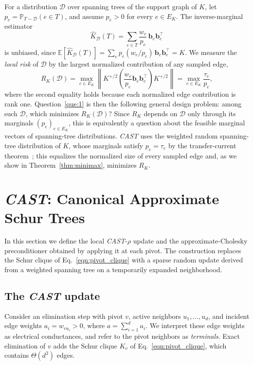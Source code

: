 \documentclass{article}
\newcommand{\CAST}{\textit{CAST}\xspace}
\newcommand{\1}{\mathbbm{1}}
\theoremstyle{plain}
\begin{document}
For a distribution $\mathcal D$ over spanning trees of the support graph of $K$, let $p_e=\mathbb{P}_{T\sim\mathcal D}(e\in T)$, and assume $p_e>0$ for every $e\in E_K$. The inverse-marginal estimator
\begin{equation*}
  \widehat K_{\mathcal{D}}(T)=\sum_{e\in T}\frac{w_e}{p_e}\,
  \mathbf b_e\mathbf b_e^\top
\end{equation*}
is unbiased, since
$\mathbb E[\widehat K_{\mathcal D}(T)]
 =\sum_e p_e(w_e/p_e)\,\mathbf b_e\mathbf b_e^\top=K$. We measure the
\emph{local risk} of $\mathcal D$ by the largest normalized contribution
of any sampled edge,
\begin{equation}\label{eq:risk}
R_K(\mathcal{D}) = \max_{e\in E_K}\left\lVert K^{+/2}\!\left(
\frac{w_e}{p_e}\mathbf b_e\mathbf b_e^\top\right)\!K^{+/2}\right\rVert
= \max_{e\in E_K}\frac{\tau_e}{p_e},
\end{equation}
where the second equality holds because each normalized edge
contribution is rank one. Question~\ref{que:1} is then the following
general design problem: among such $\mathcal D$, which minimizes
$R_K(\mathcal D)$? Since $R_K$ depends on $\mathcal D$ only through its
marginals $(p_e)_{e\in E_K}$, this is equivalently a question about the
feasible marginal vectors of spanning-tree distributions. \CAST{} uses
the weighted random spanning-tree distribution of $K$, whose marginals
satisfy $p_e=\tau_e$ by the transfer-current
theorem~\cite{lyons2003determinantal}; this equalizes the normalized size
of every sampled edge and, as we show in Theorem~\ref{thm:minimax},
minimizes $R_K$.


\section{\CAST: Canonical Approximate Schur Trees}
\label{sec:cast}

In this section we define the local \CAST-$\rho$ update and the approximate-Cholesky pre\-conditioner obtained by applying it at each
pivot. The construction replaces the Schur clique of Eq.~\eqref{eqn:pivot_clique} with a sparse random update derived from a weighted spanning tree on a temporarily expanded neighborhood.


\subsection{The \CAST{} update}
\label{sec:cast-update}

Consider an elimination step with pivot $v$, active neighbors
$u_1,\ldots,u_d$, and incident edge weights $a_i=w_{vu_i}>0$, where
$a=\sum_{i=1}^{d}a_i$. We interpret these edge weights as electrical
conductances, and refer to the pivot neighbors as \emph{terminals}.
Exact elimination of $v$ adds the Schur clique $K_v$ of
Eq.~\eqref{eqn:pivot_clique}, which contains $\Theta(d^2)$ edges.
\end{document}
